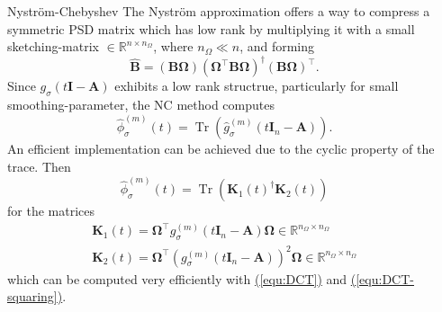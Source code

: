 \documentclass[final, 12pt]{beamer}
\newcommand{\mtx}[1]{\boldsymbol{#1}}
\DeclareMathOperator{\Tr}{Tr}
\newcommand{\refequ}[1]{\hyperref[#1]{\textcolor{linkcolor}{(\ref*{#1})}}}
\begin{document}
\begin{frame}[t]
\begin{columns}[t]
    \begin{column}{0.3\paperwidth}

        \begin{block}{Nystr\"om-Chebyshev}
            The Nystr\"om approximation offers a way to compress a symmetric
            \gls{PSD} matrix which has low rank by multiplying it with
            a small \gls{sketching-matrix} $\in \mathbb{R}^{n \times n_{\Omega}}$, where
            $n_{\Omega} \ll n$, and forming
            \begin{equation}
                \widehat{\mtx{B}} = (\mtx{B} \mtx{\Omega}) (\mtx{\Omega}^{\top} \mtx{B} \mtx{\Omega})^{\dagger} (\mtx{B} \mtx{\Omega})^{\top}.
            \end{equation}
            Since $g_{\sigma}(t\mtx{I} - \mtx{A})$ exhibits a low rank structrue,
            particularly for small \gls{smoothing-parameter}, the \gls{NC}
            method computes
            \begin{equation}
                \boxed{\widehat{\phi}_{\sigma}^{(m)}(t) = \Tr(\widehat{g}_{\sigma}^{(m)}(t\mtx{I}_n - \mtx{A})).}
            \end{equation}
            An efficient implementation can be achieved due to the cyclic property
            of the trace. Then
            \begin{equation}
                \widehat{\phi}_{\sigma}^{(m)}(t) = \Tr(\mtx{K}_1(t)^{\dagger} \mtx{K}_2(t))
            \end{equation}
            for the matrices 
            \begin{align}
                \mtx{K}_1(t) = \mtx{\Omega}^{\top} g_{\sigma}^{(m)}(t\mtx{I}_n - \mtx{A}) \mtx{\Omega} \in \mathbb{R}^{n_{\Omega} \times n_{\Omega}} \\
                \mtx{K}_2(t) = \mtx{\Omega}^{\top} (g_{\sigma}^{(m)}(t\mtx{I}_n - \mtx{A}))^2 \mtx{\Omega} \in \mathbb{R}^{n_{\Omega} \times n_{\Omega}}
            \end{align}
            which can be computed very efficiently with \refequ{equ:DCT} and \refequ{equ:DCT-squaring}.
        \end{block}

    \end{column}

    \begin{column}{0.3\paperwidth}


\end{column}
\end{columns}
\end{frame}
\end{document}
